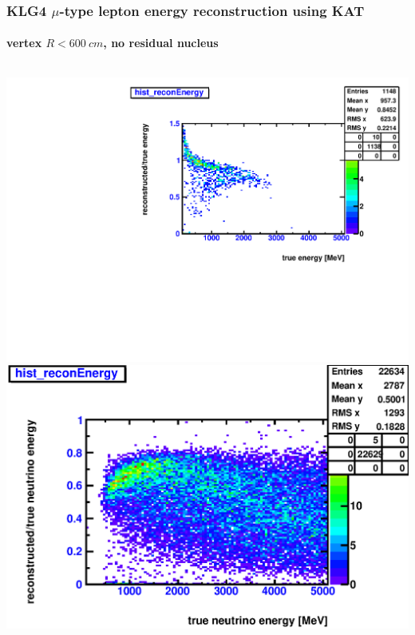 \documentclass{beamer}
\begin{document}
\begin{frame}
\begin{columns}[T]
	\end{columns}
\end{frame}

\begin{frame}
	\frametitle{KLG4 $\mu$-type lepton energy reconstruction using KAT}
	\framesubtitle{vertex $R < \SI{600}{cm}$, no residual nucleus}
	\begin{columns}[T]
		\ce{\mu^{-}}
		\includegraphics[width=1.0\textwidth]{analyzed_mtq_flatSpectrum_mu-_outerBufferFillAll_reconVSTrueEnergy_maxR600cm.pdf}
		\includegraphics[width=1.0\textwidth]{analyzed_mtq_flatSpectrum_numu_H1_outerBufferFillAll_reconVSTrueEnergy_onlyCC_maxR600cm.eps}

\end{columns}
\end{frame}
\end{document}
